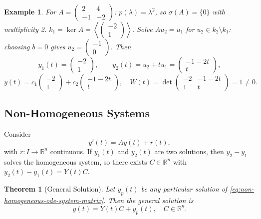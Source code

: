 \documentclass{article}
\newtheorem{theorem}{Theorem}
\newtheorem*{example}{Example}
\newcommand{\R}{\mathbb{R}}
\begin{document}
\begin{example}
    For $A = \begin{pmatrix}2&4\\-1&-2\end{pmatrix}$: 
    $p(\lambda) = \lambda^2$, so $\sigma(A) = \{0\}$ with 
    multiplicity 2. 
    $k_1 = \ker A = \left\langle\begin{pmatrix}-2\\1
    \end{pmatrix}\right\rangle$.
    Solve $Au_2 = u_1$ for $u_2 \in k_2\setminus k_1$: choosing 
    $b=0$ gives $u_2 = \begin{pmatrix}-1\\0\end{pmatrix}$. Then
    \[y_1(t) = \begin{pmatrix}-2\\1\end{pmatrix}, \qquad 
    y_2(t) = u_2 + tu_1 = 
    \begin{pmatrix}-1-2t\\t\end{pmatrix},\]
    \[y(t) = c_1\begin{pmatrix}-2\\1\end{pmatrix} + 
    c_2\begin{pmatrix}-1-2t\\t\end{pmatrix}, \quad W(t) = 
    \det\begin{pmatrix}-2&-1-2t\\1&t\end{pmatrix} = 1 \neq 0.\]
\end{example}

\subsection{Non-Homogeneous Systems}

Consider
\begin{equation}
    \label{eq:non-homogeneous-ode-system-matrix}
    y'(t) = Ay(t) + r(t),
\end{equation}
with $r: I \to \R^n$ continuous. If $y_1(t)$ and $y_2(t)$ are two solutions, then 
$y_2 - y_1$ solves the homogeneous system, so there exists 
$C \in \R^n$ with $y_2(t) - y_1(t) = Y(t)C$.

\begin{theorem}[General Solution]
    Let $y_p(t)$ be any particular solution of 
    \eqref{eq:non-homogeneous-ode-system-matrix}. Then the general 
    solution is
    \[y(t) = Y(t)C + y_p(t), \quad C \in \R^n.\]
\end{theorem}
\end{document}

